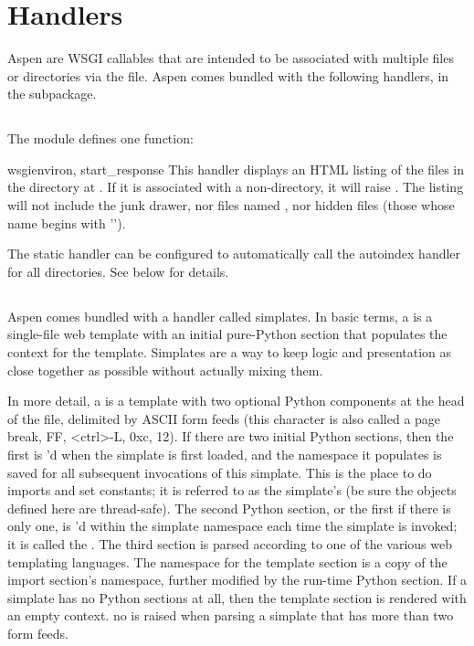 \section{Handlers}
\label {api-handlers}

Aspen  are WSGI callables that are intended to be associated with
multiple files or directories via the  file. Aspen comes
bundled with the following handlers, in the  subpackage.


\subsection{}
\label{api-handlers-http}

The  module defines one function:

\begin{funcdesc}{wsgi}{environ, start_response} This handler displays an HTML
listing of the files in the directory at . If
it is associated with a non-directory, it will raise . The
listing will not include the junk drawer, nor files named
, nor hidden files (those whose name begins with '').
\end{funcdesc}

The static handler can be configured to automatically call the autoindex handler
for all directories. See below for details.


\subsection{}
\label{api-handlers-simplates}

Aspen comes bundled with a handler called simplates. In basic terms, a
 is a single-file web template with an initial pure-Python section
that populates the context for the template. Simplates are a way to keep logic
and presentation as close together as possible without actually mixing them.

In more detail, a  is a template with two optional Python
components at the head of the file, delimited by ASCII form feeds (this
character is also called a page break, FF, <ctrl>-L, 0xc, 12). If there are two
initial Python sections, then the first is 'd when the simplate is
first loaded, and the namespace it populates is saved for all subsequent
invocations of this simplate. This is the place to do imports and set constants;
it is referred to as the simplate's  (be sure the objects
defined here are thread-safe). The second Python section, or the first if there
is only one, is 'd within the simplate namespace each time the
simplate is invoked; it is called the . The third
section is parsed according to one of the various web templating languages. The
namespace for the template section is a copy of the import section's namespace,
further modified by the run-time Python section. If a simplate has no Python
sections at all, then the template section is rendered with an empty context.
no is raised when parsing a simplate that has more than two
form feeds.

